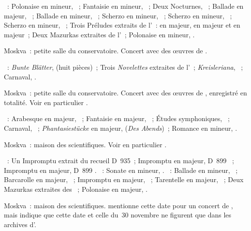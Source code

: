 \begin{description}
 \textsc{\Chopin{}}~: Polonaise en \kC \Sharp mineur,  ~;
 Fantaisie en \kF mineur, ~; Deux Nocturnes, ~; Ballade en
 \kA \Flat majeur, ~; Ballade en \kF mineur, ~; Scherzo en
 \kB mineur, ~; Scherzo en \kB \Flat mineur, ~; Scherzo en
 \kC \Sharp mineur, ~; Trois Préludes extraits de l'~:
  en \kA \Flat majeur,  en \kE \Flat majeur et
  en \kB \Flat majeur~; Deux Mazurkas extraites de l'~;
 Polonaise en \kF \Sharp mineur, .
 \item[\DateWithWeekDay{1959-11-04}]
 Moskva~: petite salle du conservatoire.
 Concert avec des œuvres de \Schumann{}.

 \textsc{\Schumann{}}~: \emph{Bunte Blätter},  (huit pièces)~;
 Trois \emph{Novelettes} extraites de l'~; \emph{Kreisleriana},
 ~; Carnaval, .
 \item[\DateWithWeekDay{1959-11-18}]
 Moskva~: petite salle du conservatoire.
 Concert avec des œuvres de \Schumann{}, enregistré en totalité.
 Voir en particulier \citet[p.~446]{Milshteyn82a}.

 \textsc{\Schumann{}}~: Arabesque en \kC majeur, ~; Fantaisie en
 \kC majeur, ~; Études symphoniques, ~; Carnaval,
 ~; \emph{Phantasiestücke} en \kD \Flat majeur,  
 (\emph{Des Abends})~; Romance en \kB \Flat mineur,  .
 \item[\DateWithWeekDay{1959-11-30}]
 Moskva~: maison des scientifiques.
 Voir en particulier \citet[p.~446-447]{Milshteyn82a}.

 \textsc{\Schubert{}}~: Un Impromptu extrait du recueil D~935~; Impromptu en
 \kE \Flat majeur, D~899 ~; Impromptu en \kA \Flat majeur, D~899
 .
 \textsc{\Schumann{}}~: Sonate en \kF \Sharp mineur, .
 \textsc{\Chopin{}}~: Ballade en \kG mineur, ~; Barcarolle en \kF
 \Sharp majeur, ~; Impromptu en \kG \Flat majeur, ~;
 Tarentelle en \kA \Flat majeur, ~; Deux Mazurkas extraites des
 ~; Polonaise en \kA \Flat majeur, .
 \item[\DateWithWeekDay{1959-12-03}]
 Moskva~: maison des scientifiques.
 \citet[p.~181]{Nekrasova08} mentionne cette date pour un concert de
 \VSofronitsky{}, mais indique que cette date et celle du~30 novembre ne
 figurent que dans les archives d'\AVizel{}.
\end{description}

